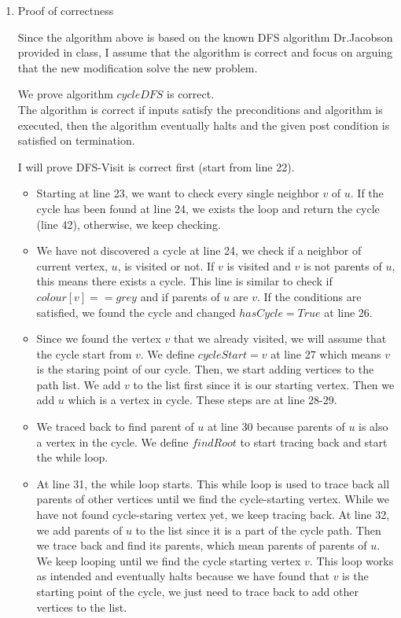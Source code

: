 \documentclass{cpsc413Solutions}
\begin{document}
\begin{problemlist}
\begin{problem}
\begin{answer}
\begin{enumerate}
    \item Proof of correctness
    
    Since the algorithm above is based on the known DFS algorithm Dr.Jacobson provided in class, I assume that the algorithm is correct and focus on arguing that the new modification solve the new problem.
    
    We prove algorithm $cycleDFS$ is correct.\\
    The algorithm is correct if inputs satisfy the preconditions and algorithm is executed, then the algorithm eventually halts and the given post condition is satisfied on termination.
    
    I will prove DFS-Visit is correct first (start from line 22).
    \begin{itemize}
        \item Starting at line 23, we want to check every single neighbor $v$ of $u$. If the cycle has been found at line 24, we exists the loop and return the cycle (line 42), otherwise, we keep checking.
        
        \item We have not discovered a cycle at line 24, we check if a neighbor of current vertex, $u$, is visited or not. If $v$ is visited and $v$ is not parents of $u$, this means there exists a cycle. This line is similar to check if $colour[v] == grey$ and if parents of $u$ are $v$. If the conditions are satisfied, we found the cycle and changed $hasCycle = True$ at line 26.
        
        \item Since we found the vertex $v$ that we already visited, we will assume that the cycle start from $v$. We define $cycleStart = v$ at line 27 which means $v$ is the staring point of our cycle. Then, we start adding vertices to the path list. We add $v$ to the list first since it is our starting vertex. Then we add $u$ which is a vertex in cycle. These steps are at line 28-29.
        
        \item We traced back to find parent of $u$ at line 30 because parents of $u$ is also a vertex in the cycle. We define $findRoot$ to start tracing back and start the while loop.
        
        \item At line 31, the while loop starts. This while loop is used to trace back all parents of other vertices until we find the cycle-starting vertex. While we have not found cycle-staring vertex yet, we keep tracing back. At line 32, we add parents of $u$ to the list since it is a part of the cycle path. Then we trace back and find its parents, which mean parents of parents of $u$. We keep looping until we find the cycle starting vertex $v$. This loop works as intended and eventually halts because we have found that $v$ is the starting point of the cycle, we just need to trace back to add other vertices to the list.
        

\end{itemize}
\end{enumerate}
\end{answer}
\end{problem}
\end{problemlist}
\end{document}
